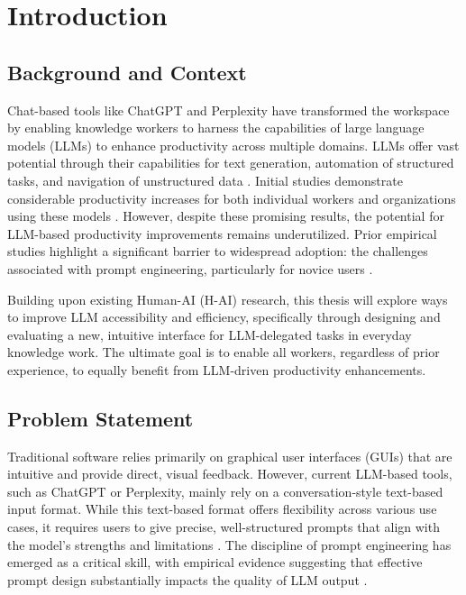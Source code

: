 
\chapter{Introduction}\label{chapter:introduction}

\section{Background and Context}

Chat-based tools like ChatGPT \cite{openai_best_202} and Perplexity \cite{perplexity_ai_perplexity_2024} have transformed the workspace by enabling knowledge workers to harness the capabilities of large language models (LLMs) to enhance productivity across multiple domains. LLMs offer vast potential through their capabilities for text generation, automation of structured tasks, and navigation of unstructured data \cite{alavi_how_2023}. Initial studies demonstrate considerable productivity increases for both individual workers and organizations using these models \cite{brynjolfsson_generative_2023, klarna_klarna_2024}. However, despite these promising results, the potential for LLM-based productivity improvements remains underutilized. Prior empirical studies highlight a significant barrier to widespread adoption: the challenges associated with prompt engineering, particularly for novice users \cite{kim_understanding_2024, zamfirescu-pereira_herding_2023, zamfirescu-pereira_why_2023}. 

Building upon existing Human-AI (H-AI) research, this thesis will explore ways to improve LLM accessibility and efficiency, specifically through designing and evaluating a new, intuitive interface for LLM-delegated tasks in everyday knowledge work. The ultimate goal is to enable all workers, regardless of prior experience, to equally benefit from LLM-driven productivity enhancements.

\section{Problem Statement}

Traditional software relies primarily on graphical user interfaces (GUIs) that are intuitive and provide direct, visual feedback. However, current LLM-based tools, such as ChatGPT or Perplexity, mainly rely on a conversation-style text-based input format. While this text-based format offers flexibility across various use cases, it requires users to give precise, well-structured prompts that align with the model’s strengths and limitations \cite{zamfirescu-pereira_why_2023}. The discipline of prompt engineering has emerged as a critical skill, with empirical evidence suggesting that effective prompt design substantially impacts the quality of LLM output \cite{chen_next_2023}.

